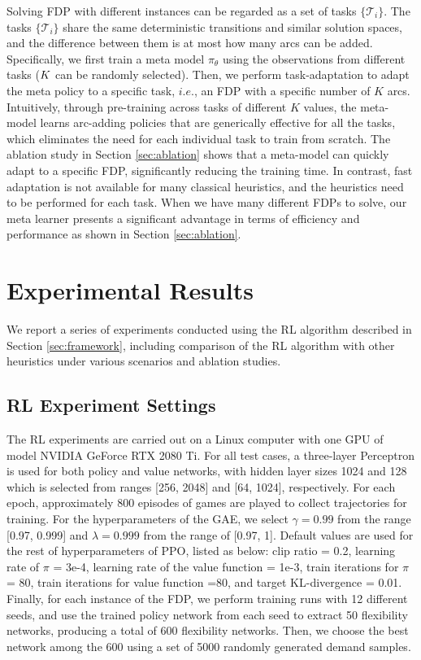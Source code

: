 \documentclass{article} %
\begin{document}
Solving FDP with different instances can be regarded as a set of tasks $\{\mathcal{T}_i\}$. The tasks $\{\mathcal{T}_i\}$ share the same deterministic transitions and similar solution spaces, and the difference between them is at most how many arcs can be added. Specifically, we first train a meta model $\pi_\theta$ using the observations from different tasks ($K$ can be randomly selected). Then, we perform task-adaptation to adapt the meta policy to a specific task, $i.e.$, an FDP with a specific number of $K$ arcs. Intuitively, through pre-training across tasks of different $K$ values, the meta-model learns arc-adding policies that are generically effective for all the tasks, which eliminates the need for each individual task to train from scratch. The ablation study in Section \ref{sec:ablation} shows that a meta-model can quickly adapt to a specific FDP, significantly reducing the training time. In contrast, fast adaptation is not available for many classical heuristics, and the heuristics need to be performed for each task. When we have many different FDPs to solve, our meta learner presents a significant advantage in terms of efficiency and performance as shown in Section \ref{sec:ablation}.  


\section{Experimental Results}\label{sec:numstudies}
We report a series of experiments conducted using the RL algorithm described in Section \ref{sec:framework}, including comparison of the RL algorithm with other heuristics under various scenarios and ablation studies. 


\subsection{RL Experiment Settings}
The RL experiments are carried out on a Linux computer with one GPU of model NVIDIA GeForce RTX 2080 Ti. For all test cases, a three-layer Perceptron is used for both policy and value networks, with hidden layer sizes 1024 and 128 which is selected from ranges [256, 2048] and [64, 1024], respectively. 
For each epoch, approximately 800 episodes of games are played to collect trajectories for training. 
For the hyperparameters of the GAE, we select $\gamma = 0.99$ from the range [0.97, 0.999] and $\lambda = 0.999$ from the range of [0.97, 1]. Default values are used for the rest of hyperparameters of PPO, listed as below: 
clip ratio = 0.2, 
learning rate of $\pi$ = 3e-4,
 learning rate of the value function = 1e-3, 
train iterations for $\pi$ = 80, 
train iterations for value function =80, and 
target KL-divergence = 0.01.
Finally, for each instance of the FDP, we perform training runs with 12 different seeds, and use the trained policy network from each seed to extract 50 flexibility networks, producing a total of 600 flexibility networks. Then, we choose the best network among the 600 using a set of 5000 randomly generated demand samples.
\end{document}
